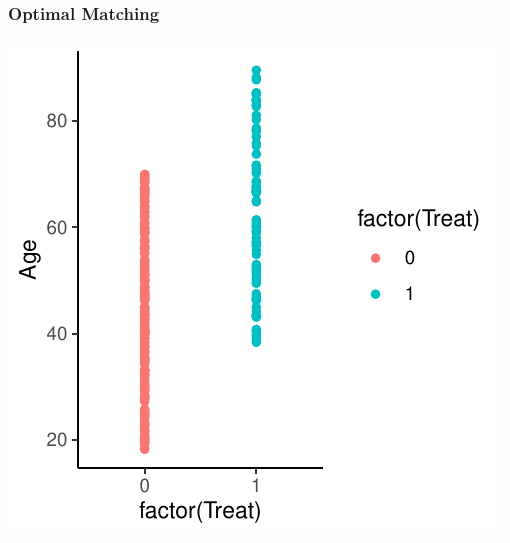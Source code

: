 \documentclass[xcolor=x11names,compress]{beamer}\usepackage[]{graphicx}\usepackage[]{color}
\makeatletter
\def\maxwidth{ %
  \ifdim\Gin@nat@width>\linewidth
    \linewidth
  \else
    \Gin@nat@width
  \fi
}
\newenvironment{knitrout}{}{} %
\renewcommand{\(}{\begin{columns}}
\renewcommand{\)}{\end{columns}}
\newcommand{\<}[1]{\begin{column}{#1}}
\renewcommand{\>}{\end{column}}
\makeatother
\begin{document}
\begin{frame}
\frametitle{Optimal Matching}
\begin{center}
\begin{knitrout}
\color{fgcolor}
\includegraphics[width=\maxwidth]{figure/optimal_matching_1-1} 

\end{knitrout}
\end{center}
\end{frame}
\end{document}
